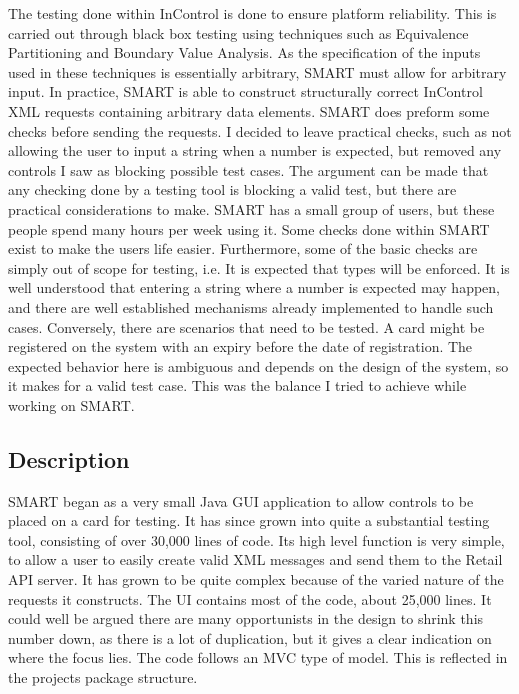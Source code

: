 \documentclass[a4paper, 11pt, titlepage]{article}
\begin{document}
The testing done within InControl is done to ensure platform reliability. This is carried out through black box testing using techniques such as Equivalence Partitioning and Boundary Value Analysis. As the specification of the inputs used in these techniques is essentially arbitrary, SMART must allow for arbitrary input. In practice, SMART is able to construct structurally correct InControl XML requests containing arbitrary data elements. SMART does preform some checks before sending the requests. I decided to leave practical checks, such as not allowing the user to input a string when a number is expected, but removed any controls I saw as blocking possible test cases. The argument can be made that any checking done by a testing tool is blocking a valid test, but there are practical considerations to make. SMART has a small group of users, but these people spend many hours per week using it. Some checks done within SMART exist to make the users life easier. Furthermore, some of the basic checks are simply out of scope for testing, i.e. It is expected that types will be enforced. It is well understood that entering a string where a number is expected may happen, and there are well established mechanisms already implemented to handle such cases. Conversely, there are scenarios that need to be tested. A card might be registered on the system with an expiry before the date of registration. The expected behavior here is ambiguous and depends on the design of the system, so it makes for a valid test case. This was the balance I tried to achieve while working on SMART.  

\subsection{Description} 
 
SMART began as a very small Java GUI application to allow controls to be placed on a card for testing. It has since grown into quite a substantial testing tool, consisting of over 30,000 lines of code. Its high level function is very simple, to allow a user to easily create valid XML messages and send them to the Retail API server. It has grown to be quite complex because of the varied nature of the requests it constructs. The UI contains most of the code, about 25,000 lines. It could well be argued there are many opportunists in the design to shrink this number down, as there is a lot of duplication, but it gives a clear indication on where the focus lies. 
\label{OILIntro} 
The code follows an MVC type of model. This is reflected in the projects package structure.
\end{document}
